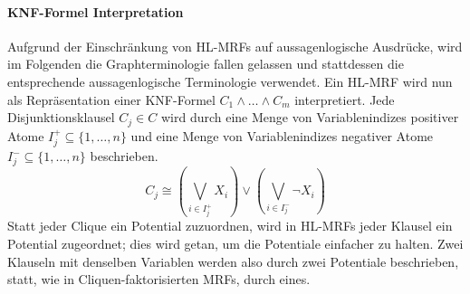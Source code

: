 \paragraph{KNF-Formel Interpretation}
Aufgrund der Einschränkung von HL-MRFs auf aussagenlogische Ausdrücke, wird im Folgenden die Graphterminologie fallen gelassen und stattdessen die entsprechende aussagen\-logische Terminologie verwendet.
Ein HL-MRF wird nun als Repräsentation einer KNF-Formel $C_1 \land \dots \land C_m$ interpretiert.
Jede Disjunktionsklausel $C_j \in C$ wird durch eine Menge von Variablenindizes positiver Atome $I^{+}_j \subseteq \{1,\dots,n\}$ und eine Menge von Variablenindizes negativer Atome $I^{-}_j \subseteq \{1,\dots,n\}$ beschrieben.
\[
	C_j \cong \left(\bigvee_{i \in I^{+}_j} X_i\right) \lor \left(\bigvee_{i \in I^{-}_j} \lnot X_i\right)
\]
Statt jeder Clique ein Potential zuzuordnen, wird in HL-MRFs jeder Klausel ein Potential zugeordnet;
dies wird getan, um die Potentiale einfacher zu halten.
Zwei Klauseln mit denselben Variablen werden also durch zwei Potentiale beschrieben, statt, wie in Cliquen-faktorisierten MRFs, durch eines.

